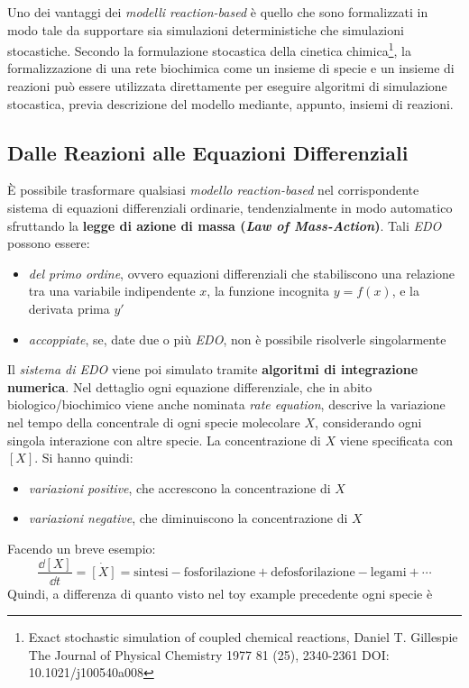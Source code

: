 \documentclass[a4paper,12pt, oneside]{book}
\begin{document}
Uno dei vantaggi dei \textit{modelli reaction-based} è quello che sono
formalizzati in modo tale da supportare sia simulazioni deterministiche che
simulazioni stocastiche. Secondo la formulazione stocastica della cinetica
chimica\footnote{Exact stochastic simulation of coupled chemical reactions,
Daniel T. Gillespie
The Journal of Physical Chemistry 1977 81 (25), 2340-2361
DOI: 10.1021/j100540a008 }, la formalizzazione di una rete
biochimica come un insieme di specie e un insieme di reazioni può essere
utilizzata direttamente per eseguire algoritmi di simulazione stocastica, previa
descrizione del modello mediante, appunto, insiemi di reazioni.
\subsection{Dalle Reazioni alle Equazioni Differenziali}
È possibile trasformare qualsiasi \textit{modello reaction-based} nel
corrispondente sistema di equazioni differenziali ordinarie, tendenzialmente in
modo automatico sfruttando la \textbf{legge di azione di massa (\textit{Law of
    Mass-Action})}. Tali \textit{EDO} possono essere:
\begin{itemize}
  \item \textit{del primo ordine}, ovvero equazioni differenziali che
  stabiliscono una relazione tra una variabile indipendente $x$,  la funzione
  incognita $y = f(x)$, e la derivata prima $y'$
  \item \textit{accoppiate}, se, date due o più \textit{EDO}, non è possibile
  risolverle singolarmente 
\end{itemize}
Il \textit{sistema di EDO} viene poi simulato tramite \textbf{algoritmi di
  integrazione numerica}. Nel dettaglio ogni equazione differenziale, che in
abito biologico/biochimico viene anche nominata \textit{rate equation}, descrive
la variazione nel tempo della concentrale di ogni specie molecolare $X$,
considerando ogni singola interazione con altre specie. La concentrazione di $X$
viene specificata con $[X]$. Si hanno quindi:
\begin{itemize}
  \item \textit{variazioni positive}, che accrescono la concentrazione di $X$
  \item \textit{variazioni negative}, che diminuiscono la concentrazione di $X$
\end{itemize}
Facendo un breve esempio:
\[\frac{\dd{[X]}}{\dd{t}}=\dot{[X]}=\mbox{sintesi}-
  \mbox{fosforilazione}+\mbox{defosforilazione}-\mbox{legami}+\cdots\]
Quindi, a differenza di quanto visto nel toy example precedente ogni specie è
\end{document}
